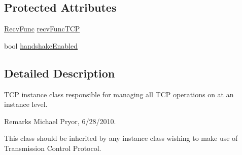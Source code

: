 \subsection*{Protected Attributes}
\begin{DoxyCompactItemize}
\item 
\hyperlink{classcl_instance_core_afa96c2a2c0b26b6a9256b87798bf9587}{RecvFunc} \hyperlink{classcl_instance_t_c_p_aae4ec2a4dd6ac904c67e53c0620e2843}{recvFuncTCP}
\item 
bool \hyperlink{classcl_instance_t_c_p_a4a35647e926d2c2c5abec877242f69fa}{handshakeEnabled}
\end{DoxyCompactItemize}


\subsection{Detailed Description}
TCP instance class responsible for managing all TCP operations on at an instance level. \begin{DoxyRemark}{Remarks}
Michael Pryor, 6/28/2010.
\end{DoxyRemark}
This class should be inherited by any instance class wishing to make use of Transmission Control Protocol. 


